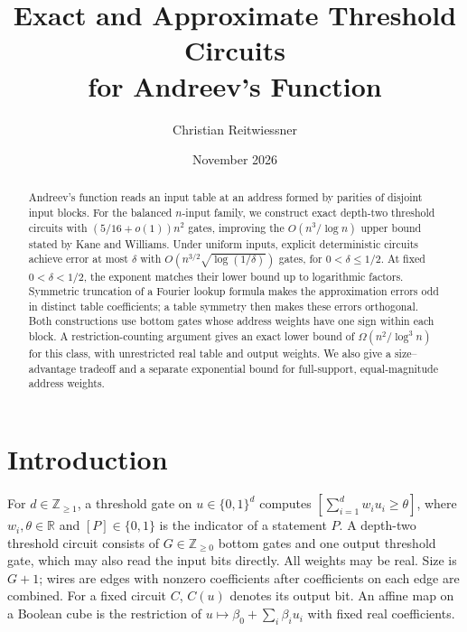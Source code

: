 \documentclass[11pt]{article}
\title{Exact and Approximate Threshold Circuits\\for Andreev's Function}
\author{Christian Reitwiessner}
\date{November 2026}
\newcommand{\bits}{\{0,1\}}
\begin{document}
\maketitle
\begin{abstract}
Andreev's function reads an input table at an address formed by parities
of disjoint input blocks. For the balanced $n$-input family, we construct
exact depth-two threshold circuits with $(5/16+o(1))n^2$ gates, improving
the $O(n^3/\log n)$ upper bound stated by Kane and Williams. Under
uniform inputs, explicit deterministic circuits achieve error at most
$\delta$ with $O(n^{3/2}\sqrt{\log(1/\delta)})$ gates, for
$0<\delta\le1/2$. At fixed $0<\delta<1/2$, the exponent matches
their lower bound up to logarithmic factors. Symmetric truncation of a
Fourier lookup formula makes the approximation errors odd in distinct
table coefficients; a table symmetry then makes these errors orthogonal.
Both constructions use bottom gates whose address weights have one sign
within each block. A restriction-counting argument gives an exact lower
bound of $\Omega(n^2/\log^3 n)$ for this class, with unrestricted real
table and output weights. We also give a size--advantage tradeoff and a
separate exponential bound for full-support, equal-magnitude address weights.
\end{abstract}

\section{Introduction}
For $d\in\mathbb Z_{\ge1}$, a threshold gate on $u\in\bits^d$ computes
$[\sum_{i=1}^d w_i u_i\ge\theta]$, where $w_i,\theta\in\mathbb R$
and $[P]\in\bits$ is the indicator of a statement $P$.
A depth-two threshold circuit consists of $G\in\mathbb Z_{\ge0}$ bottom
gates and one output threshold gate, which may also read the input bits
directly. All weights may be real. Size is $G+1$; wires are edges with
nonzero coefficients after coefficients on each edge are combined.
For a fixed circuit $C$, $C(u)$ denotes its output bit.
An affine map on a Boolean cube is the restriction of
$u\mapsto\beta_0+\sum_i\beta_i u_i$ with fixed real coefficients.
\end{document}
